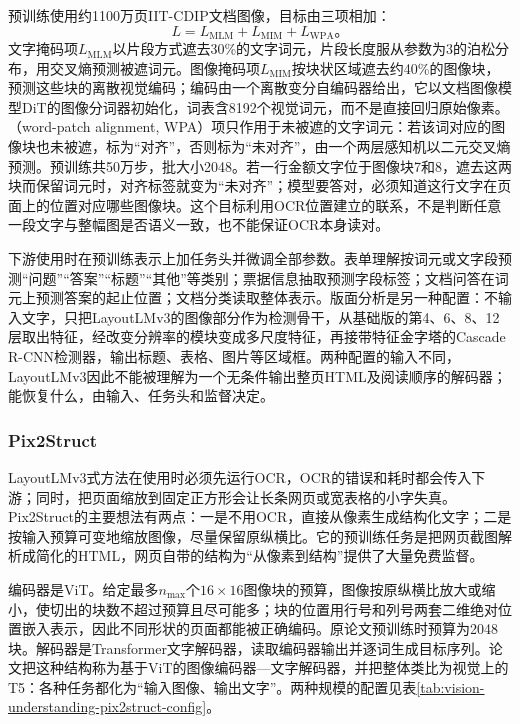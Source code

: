 预训练使用约1100万页IIT-CDIP文档图像，目标由三项相加：
\begin{equation}
  L=L_{\mathrm{MLM}}+L_{\mathrm{MIM}}+L_{\mathrm{WPA}}\text{。}
  \label{eq:vision-layoutlmv3-loss}
\end{equation}
文字掩码项$L_{\mathrm{MLM}}$以片段方式遮去30\%的文字词元，片段长度服从参数为3的泊松分布，用交叉熵预测被遮词元。图像掩码项$L_{\mathrm{MIM}}$按块状区域遮去约40\%的图像块，预测这些块的离散视觉编码；编码由一个离散变分自编码器给出，它以文档图像模型DiT的图像分词器初始化，词表含8192个视觉词元，而不是直接回归原始像素。（word-patch alignment, WPA）项只作用于未被遮的文字词元：若该词对应的图像块也未被遮，标为“对齐”，否则标为“未对齐”，由一个两层感知机以二元交叉熵预测。预训练共50万步，批大小2048。若一行金额文字位于图像块7和8，遮去这两块而保留词元时，对齐标签就变为“未对齐”；模型要答对，必须知道这行文字在页面上的位置对应哪些图像块。这个目标利用OCR位置建立的联系，不是判断任意一段文字与整幅图是否语义一致，也不能保证OCR本身读对。

下游使用时在预训练表示上加任务头并微调全部参数。表单理解按词元或文字段预测“问题”“答案”“标题”“其他”等类别；票据信息抽取预测字段标签；文档问答在词元上预测答案的起止位置；文档分类读取整体表示。版面分析是另一种配置：不输入文字，只把LayoutLMv3的图像部分作为检测骨干，从基础版的第4、6、8、12层取出特征，经改变分辨率的模块变成多尺度特征，再接带特征金字塔的Cascade R-CNN检测器，输出标题、表格、图片等区域框。两种配置的输入不同，LayoutLMv3因此不能被理解为一个无条件输出整页HTML及阅读顺序的解码器；能恢复什么，由输入、任务头和监督决定。

\subsubsection{Pix2Struct}
\label{sec:vision-understanding-pix2struct}

LayoutLMv3式方法在使用时必须先运行OCR，OCR的错误和耗时都会传入下游；同时，把页面缩放到固定正方形会让长条网页或宽表格的小字失真。Pix2Struct的主要想法有两点：一是不用OCR，直接从像素生成结构化文字；二是按输入预算可变地缩放图像，尽量保留原纵横比。它的预训练任务是把网页截图解析成简化的HTML，网页自带的结构为“从像素到结构”提供了大量免费监督。

编码器是ViT。给定最多$n_{\max}$个$16\times16$图像块的预算，图像按原纵横比放大或缩小，使切出的块数不超过预算且尽可能多；块的位置用行号和列号两套二维绝对位置嵌入表示，因此不同形状的页面都能被正确编码。原论文预训练时预算为2048块。解码器是Transformer文字解码器，读取编码器输出并逐词生成目标序列。论文把这种结构称为基于ViT的图像编码器—文字解码器，并把整体类比为视觉上的T5：各种任务都化为“输入图像、输出文字”。两种规模的配置见表\ref{tab:vision-understanding-pix2struct-config}。

